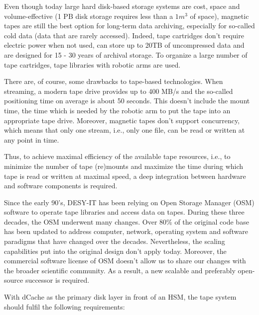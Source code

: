 \documentclass{webofc}
\begin{document}
Even though today large hard disk-based storage systems are cost, space and volume-effective (1 PB disk storage requires less than a ${1m^{3}}$ of space),
magnetic tapes are still the best option for long-term data archiving, especially for so-called cold data (data that are rarely accessed).
Indeed, tape cartridges don't require electric power when not used, can store up to 20TB of uncompressed data and are designed for
15 - 30 years of archival storage. To organize a large number of tape cartridges, tape libraries with robotic arms are used.

There are, of course, some drawbacks to tape-based technologies. When streaming, a modern tape drive provides up to 400 MB/s
and the so-called positioning time on average is about 50 seconds. This doesn't include the mount time, the time which is needed by the
robotic arm to put the tape into an appropriate tape drive. Moreover, magnetic tapes don't support concurrency, which means that only
one stream, i.e., only one file, can be read or written at any point in time.

Thus, to achieve maximal efficiency of the available tape resources, i.e., to minimize the number of tape (re)mounts and maximize the time during which tape is read or written at
maximal speed, a deep integration between hardware and software components is required.

Since the early 90's, DESY-IT has been relying on Open Storage Manager (OSM) software to operate tape libraries and access data on tapes\cite{osm_desy}.
During these three decades, the OSM underwent many changes. Over 80\% of the original code base has been updated to address computer, network,
operating system and software paradigms that have changed over the decades. Nevertheless, the scaling capabilities put into the original design
don't apply today. Moreover, the commercial software license of OSM doesn't allow us to share our changes with the broader scientific community.
As a result, a new scalable and preferably open-source successor is required.

With dCache as the primary disk layer in front of an HSM, the tape system should fulfil the following requirements:
\end{document}
